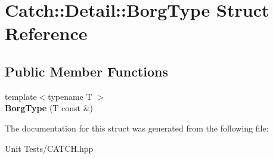 \hypertarget{structCatch_1_1Detail_1_1BorgType}{}\section{Catch\+:\+:Detail\+:\+:Borg\+Type Struct Reference}
\label{structCatch_1_1Detail_1_1BorgType}
\subsection*{Public Member Functions}
\begin{DoxyCompactItemize}
\item 
{\footnotesize template$<$typename T $>$ }\\{\bfseries Borg\+Type} (T const \&)\hypertarget{structCatch_1_1Detail_1_1BorgType_a780a9946ed0d654f0bfc043c8fc505d8}{}\label{structCatch_1_1Detail_1_1BorgType_a780a9946ed0d654f0bfc043c8fc505d8}

\end{DoxyCompactItemize}


The documentation for this struct was generated from the following file\+:\begin{DoxyCompactItemize}
\item 
Unit Tests/C\+A\+T\+C\+H.\+hpp\end{DoxyCompactItemize}
